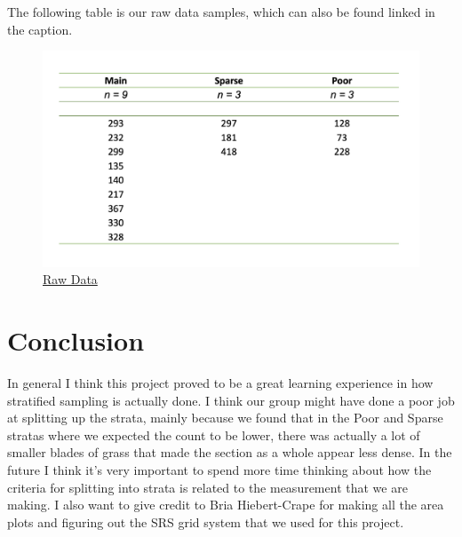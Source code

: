 \documentclass[12pt]{amsart}
\begin{document}
The following table is our raw data samples, which can also be found linked in the caption. 

\begin{figure}[H]
    \begin{center}
    \caption{\href{https://github.com/StefanoFochesatto/STAT-402/blob/main/SamplingProject.csv}{Raw Data}}
    \includegraphics[width=.66\linewidth]{fig5.png}
    \end{center}
\end{figure}


\section{Conclusion}
In general I think this project proved to be a great learning experience in how stratified sampling is actually done. I think our group 
might have done a poor job at splitting up the strata, mainly because we found that in the Poor and Sparse stratas where we expected the 
count to be lower, there was actually a lot of smaller blades of grass that made the section as a whole appear less dense. In the future I think it's 
very important to spend more time thinking about how the criteria for splitting into strata is related to the measurement that we are making. I also want 
to give credit to Bria Hiebert-Crape for making all the area plots and figuring out the SRS grid system that we used for this project. 
\end{document}
